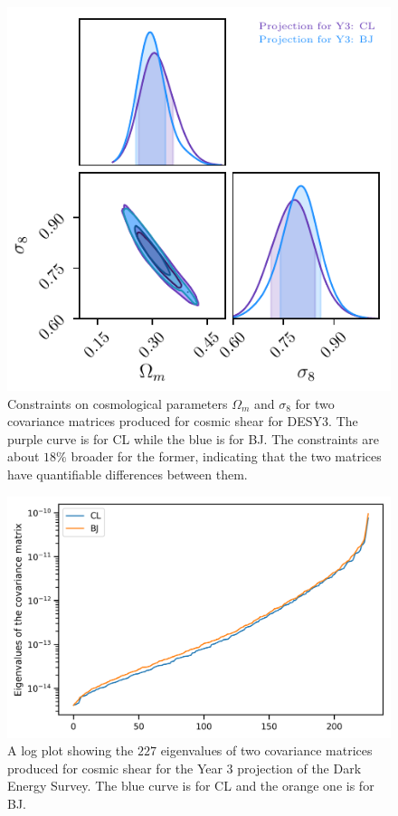 \documentclass[twocolumn]{\docclass}
\begin{document}
\begin{figure}
\includegraphics[width=0.9\columnwidth]{Y3-comparison.pdf}
\caption{Constraints on cosmological parameters $\Omega_m$ and $\sigma_8$ for two covariance matrices produced for cosmic shear for DESY3. The purple curve is for CL while the blue is for BJ. The constraints are about $18 \%$ broader for the former, indicating that the two matrices have quantifiable differences between them. \label{fig:y3-comparison}}
\end{figure}

\begin{figure}
\includegraphics[width=0.9\columnwidth]{coveigen_BJ-CL.png}
\caption{A log plot showing the $227$ eigenvalues of two covariance matrices produced for cosmic shear for the Year 3 projection of the Dark Energy Survey. The blue curve is for CL and the orange one is for BJ. \label{fig:coveigen}}
\end{figure}
\end{document}
